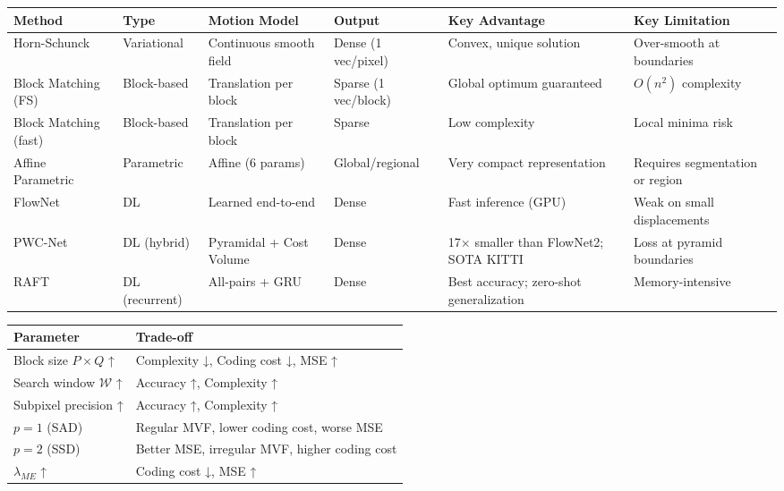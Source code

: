 \begin{center}
\begin{tabular}{|l|l|l|l|l|l|}
\hline
\textbf{Method} & \textbf{Type} & \textbf{Motion Model} & \textbf{Output} & \textbf{Key Advantage} & \textbf{Key Limitation} \\ \hline
Horn-Schunck & Variational & Continuous smooth field & Dense (1 vec/pixel) & Convex, unique solution & Over-smooth at boundaries \\ \hline
Block Matching (FS) & Block-based & Translation per block & Sparse (1 vec/block) & Global optimum guaranteed & $O(n^2)$ complexity \\ \hline
Block Matching (fast) & Block-based & Translation per block & Sparse & Low complexity & Local minima risk \\ \hline
Affine Parametric & Parametric & Affine (6 params) & Global/regional & Very compact representation & Requires segmentation or region \\ \hline
FlowNet & DL & Learned end-to-end & Dense & Fast inference (GPU) & Weak on small displacements \\ \hline
PWC-Net & DL (hybrid) & Pyramidal + Cost Volume & Dense & 17× smaller than FlowNet2; SOTA KITTI & Loss at pyramid boundaries \\ \hline
RAFT & DL (recurrent) & All-pairs + GRU & Dense & Best accuracy; zero-shot generalization & Memory-intensive \\ \hline
\end{tabular}
\end{center}

\begin{center}
\begin{tabular}{|l|l|}
\hline
\textbf{Parameter} & \textbf{Trade-off} \\ \hline
Block size $P \times Q$ ↑ & Complexity ↓, Coding cost ↓, MSE ↑ \\ \hline
Search window $\mathcal{W}$ ↑ & Accuracy ↑, Complexity ↑ \\ \hline
Subpixel precision ↑ & Accuracy ↑, Complexity ↑ \\ \hline
$p = 1$ (SAD) & Regular MVF, lower coding cost, worse MSE \\ \hline
$p = 2$ (SSD) & Better MSE, irregular MVF, higher coding cost \\ \hline
$\lambda_{ME}$ ↑ & Coding cost ↓, MSE ↑ \\ \hline
\end{tabular}
\end{center}

